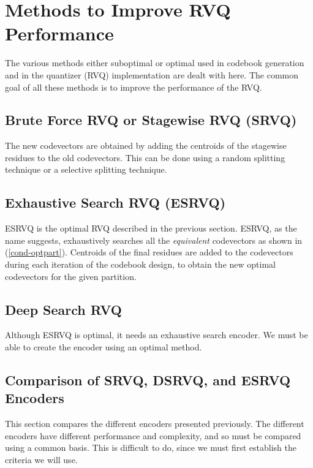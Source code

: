 \section{Methods to Improve RVQ Performance}

The various  methods either suboptimal or optimal used in codebook generation
 and in the quantizer (RVQ) implementation are dealt with here.  The common
 goal of all these methods is to improve the performance of the RVQ. 

\subsection{Brute Force RVQ or Stagewise RVQ (SRVQ)}

The new codevectors are obtained by adding the centroids of the
stagewise residues to the old codevectors.  This can be done using a
random splitting technique or a selective splitting technique.

\subsection{Exhaustive Search RVQ (ESRVQ)}

ESRVQ is the optimal RVQ described in the previous section.  ESRVQ, as
the name suggests, exhaustively searches all the {\em equivalent}
codevectors as shown in (\ref{cond-optpart}).  Centroids of the final
residues are added to the codevectors during each iteration of the
codebook design, to obtain the new optimal codevectors for the given
partition.

\subsection{Deep Search RVQ}

Although ESRVQ is optimal, it needs an exhaustive search encoder. We
must be able to create the encoder using an optimal method. 


\subsection{Comparison of SRVQ, DSRVQ, and ESRVQ Encoders}

This section compares the different encoders presented previously.
The different encoders have different performance and complexity, and
so must be compared using a common basis.  This is difficult to do,
since we must first establish the criteria we will use.

